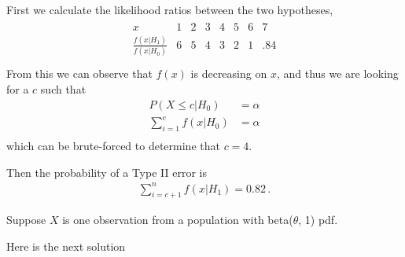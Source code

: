 \documentclass[12pt,letterpaper]{exam}
\begin{document}
\begin{questions}
	\begin{solution}
		First we calculate the likelihood ratios between the two hypotheses,
		\begin{align*}
			\begin{array}{cccccccc}
				x & 1 & 2 & 3 & 4 & 5 & 6 & 7 \\ \hline 
				\frac{f(x|H_1)}{f(x|H_0)} & 6 & 5 & 4 & 3 & 2 & 1 & .84 \\
			\end{array}
		\end{align*}
		From this we can observe that \(f(x)\) is decreasing on \(x\), 
		and thus we are looking for a \(c\) such that
		\begin{align*}
			P(X\leq c|H_0) &= \alpha \\
			\sum_{i=1}^{c} f(x|H_0) &= \alpha \\
		\end{align*}
		which can be brute-forced to determine that \(c=4\).
		
		Then the probability of a Type II error is
		\begin{align*}
			\sum_{i=c+1}^{n} f(x|H_1) = 0.82 \,.
		\end{align*}
	
	\end{solution}
	
	\setcounter{question}{23-1}
	
	\question 
	Suppose $X$ is one observation from a population with beta($\theta$, 1) pdf.
	
	\begin{solution}
		Here is the next solution
	\end{solution}
	

\end{questions}
\end{document}
